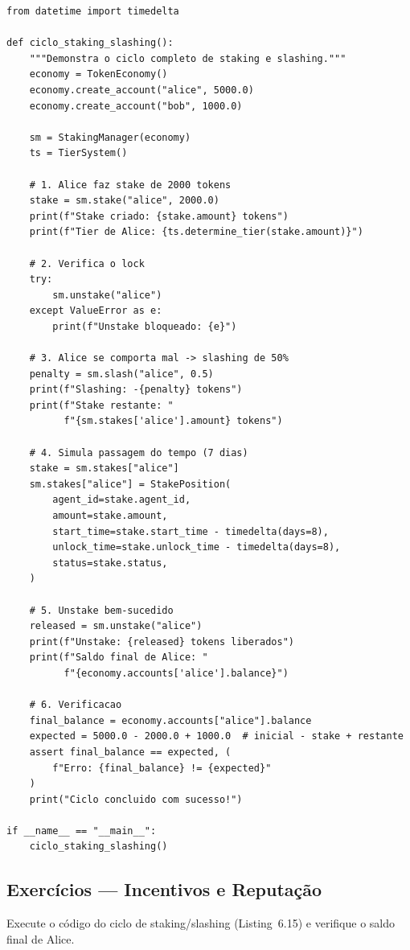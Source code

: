\begin{lstlisting}[caption={Ciclo completo de staking e slashing},
                  label={lst:ciclo-staking-slashing}]
from datetime import timedelta

def ciclo_staking_slashing():
    """Demonstra o ciclo completo de staking e slashing."""
    economy = TokenEconomy()
    economy.create_account("alice", 5000.0)
    economy.create_account("bob", 1000.0)

    sm = StakingManager(economy)
    ts = TierSystem()

    # 1. Alice faz stake de 2000 tokens
    stake = sm.stake("alice", 2000.0)
    print(f"Stake criado: {stake.amount} tokens")
    print(f"Tier de Alice: {ts.determine_tier(stake.amount)}")

    # 2. Verifica o lock
    try:
        sm.unstake("alice")
    except ValueError as e:
        print(f"Unstake bloqueado: {e}")

    # 3. Alice se comporta mal -> slashing de 50%
    penalty = sm.slash("alice", 0.5)
    print(f"Slashing: -{penalty} tokens")
    print(f"Stake restante: "
          f"{sm.stakes['alice'].amount} tokens")

    # 4. Simula passagem do tempo (7 dias)
    stake = sm.stakes["alice"]
    sm.stakes["alice"] = StakePosition(
        agent_id=stake.agent_id,
        amount=stake.amount,
        start_time=stake.start_time - timedelta(days=8),
        unlock_time=stake.unlock_time - timedelta(days=8),
        status=stake.status,
    )

    # 5. Unstake bem-sucedido
    released = sm.unstake("alice")
    print(f"Unstake: {released} tokens liberados")
    print(f"Saldo final de Alice: "
          f"{economy.accounts['alice'].balance}")

    # 6. Verificacao
    final_balance = economy.accounts["alice"].balance
    expected = 5000.0 - 2000.0 + 1000.0  # inicial - stake + restante
    assert final_balance == expected, (
        f"Erro: {final_balance} != {expected}"
    )
    print("Ciclo concluido com sucesso!")

if __name__ == "__main__":
    ciclo_staking_slashing()
\end{lstlisting}

\subsection{Exercícios — Incentivos e Reputação}

\begin{exercicio}
Execute o código do ciclo de staking/slashing (Listing~6.15)
e verifique o saldo final de Alice.
\end{exercicio}

